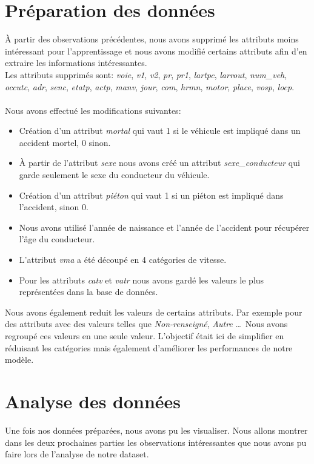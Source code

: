 \documentclass[]{article}
\begin{document}
    \section{Préparation des données}
    À partir des observations précédentes, nous avons supprimé les attributs moins intéressant pour l'apprentissage 
    et nous avons modifié certains attributs afin d'en extraire les informations intéressantes.
    \\
    Les attributs supprimés sont: \textit{voie}, \textit{v1}, \textit{v2}, \textit{pr}, \textit{pr1}, \textit{lartpc},
     \textit{larrout}, \textit{num\_veh}, \textit{occutc}, \textit{adr}, \textit{senc}, \textit{etatp}, \textit{actp}, 
     \textit{manv}, \textit{jour}, \textit{com}, \textit{hrmn}, \textit{motor}, \textit{place}, \textit{vosp}, \textit{locp}.
    \\\\
    Nous avons effectué les modifications suivantes:
    \begin{itemize}
        \item Création d'un attribut \textit{mortal} qui vaut 1 si le véhicule est impliqué dans un accident mortel, 0 sinon.
        \item À partir de l'attribut \textit{sexe} nous avons créé un attribut \textit{sexe\_conducteur} qui garde seulement 
                le sexe du conducteur du véhicule.
        \item Création d'un attribut \textit{piéton} qui vaut 1 si un piéton est impliqué dans l'accident, sinon 0.
        \item Nous avons utilisé l'année de naissance et l'année de l'accident pour récupérer l'âge du conducteur.
        \item L'attribut \textit{vma} a été découpé en 4 catégories de vitesse.
        \item Pour les attributs \textit{catv} et \textit{vatr} nous avons gardé les valeurs le plus représentées dans la base de données.
    \end{itemize}
    \vspace{0.5cm}
    Nous avons également reduit les valeurs de certains attributs. Par exemple pour des attributs 
    avec des valeurs telles que \textit{Non-renseigné}, \textit{Autre} \dots \, Nous avons regroupé 
    ces valeurs en une seule valeur. L'objectif était ici de simplifier en réduisant les catégories 
    mais également d'améliorer les performances de notre modèle.

    \section{Analyse des données}
    Une fois nos données préparées, nous avons pu les visualiser. Nous allons montrer dans les 
    deux prochaines parties les observations intéressantes que nous avons pu faire lors de 
    l'analyse de notre dataset.
\end{document}
